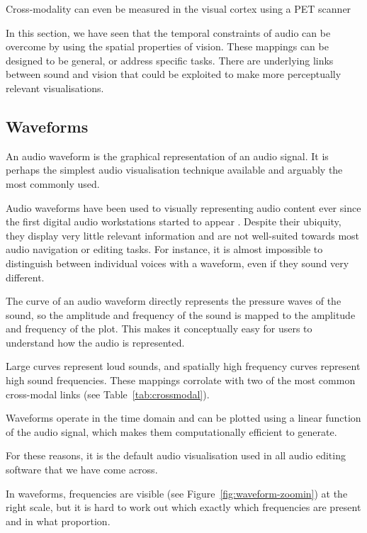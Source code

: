 Cross-modality can even be measured in the visual cortex using a PET scanner \citep{Zangenehpour2010}


In this section, we have seen that the temporal constraints of audio can be overcome by using the spatial properties of
vision. These mappings can be designed to be general, or address specific tasks. There are underlying links between
sound and vision that could be exploited to make more perceptually relevant visualisations.

\subsection{Waveforms}

An audio waveform is the graphical representation of an audio signal. It is perhaps the simplest audio visualisation
technique available and arguably the most commonly used.

Audio waveforms have been used to visually representing audio content ever since the first digital audio workstations
started to appear \citep{Massie1985}. Despite their ubiquity, they display very little relevant information and are not
well-suited towards most audio navigation or editing tasks. For instance, it is almost impossible to distinguish
between individual voices with a waveform, even if they sound very different.


The curve of an audio waveform directly represents the pressure waves of the sound, so the amplitude and frequency of
the sound is mapped to the amplitude and frequency of the plot. This makes it conceptually easy for users to
understand how the audio is represented.

Large curves represent loud sounds, and spatially high frequency curves represent high sound frequencies. These
mappings corrolate with two of the most common cross-modal links (see Table~\ref{tab:crossmodal}).

Waveforms operate in the time domain and can be plotted using a linear function of the audio signal, which makes them
computationally efficient to generate. 

For these reasons, it is the default audio visualisation used in all audio editing software that we have come across.


In waveforms, frequencies are visible (see Figure~\ref{fig:waveform-zoomin}) at the right scale, but it is hard to work
out which exactly which frequencies are present and in what proportion.

